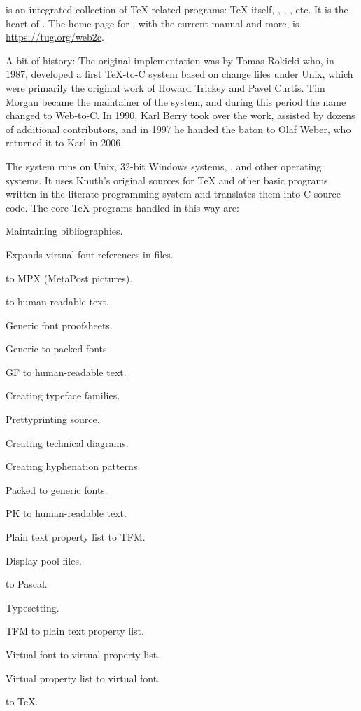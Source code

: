 \documentclass{article}
\begin{document}
\Webc{} is an integrated collection of \TeX-related programs: \TeX{}
itself, \MF{}, \MP, \BibTeX{}, etc.  It is the heart of \TL{}.  The home
page for \Webc{}, with the current manual and more, is
\url{https://tug.org/web2c}.

A bit of history: The original implementation was by Tomas Rokicki who,
in 1987, developed a first \TeX{}-to-C system based on change files
under Unix, which were primarily the original work of Howard Trickey and
Pavel Curtis.  Tim Morgan became the maintainer of the system, and
during this period the name changed to Web-to-C\@.  In 1990, Karl Berry
took over the work, assisted by dozens of additional contributors, and
in 1997 he handed the baton to Olaf Weber, who returned it to Karl in
2006.

The \Webc{} system runs on Unix, 32-bit Windows systems, \MacOSX{}, and
other operating systems. It uses Knuth's original sources for \TeX{} and
other basic programs written in the \web{} literate programming system
and translates them into C source code.  The core \TeX{} programs
handled in this way are:

\begin{cmddescription}
\item[bibtex]    Maintaining bibliographies.
\item[dvicopy]   Expands virtual font references in \dvi{} files.
\item[dvitomp]   \dvi{} to MPX (MetaPost pictures).
\item[dvitype]   \dvi{} to human-readable text.
\item[gftodvi]   Generic font proofsheets.
\item[gftopk]    Generic to packed fonts.
\item[gftype]    GF to human-readable text.
\item[mf]        Creating typeface families.
\item[mft]       Prettyprinting \MF{} source.
\item[mpost]     Creating technical diagrams.
\item[patgen]    Creating hyphenation patterns.
\item[pktogf]    Packed to generic fonts.
\item[pktype]    PK to human-readable text.
\item[pltotf]    Plain text property list to TFM.
\item[pooltype]  Display \web{} pool files.
\item[tangle]    \web{} to Pascal.
\item[tex]       Typesetting.
\item[tftopl]    TFM to plain text property list.
\item[vftovp]    Virtual font to virtual property list.
\item[vptovf]    Virtual property list to virtual font.
\item[weave]     \web{} to \TeX.
\end{cmddescription}
\end{document}
